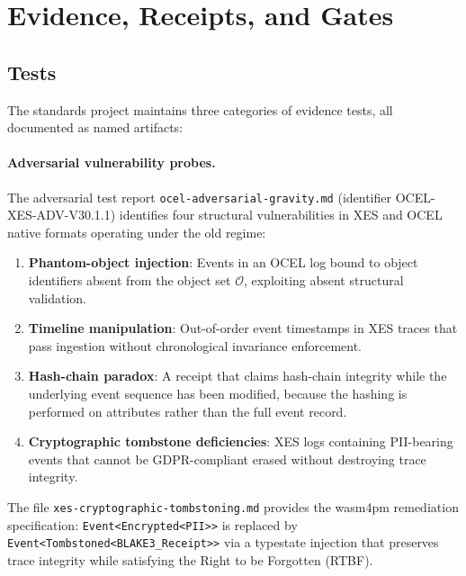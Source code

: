 
\section{Evidence, Receipts, and Gates}
\label{sec:standards-evidence}

\subsection{Tests}
\label{sec:standards-evidence-tests}

The standards project maintains three categories of evidence tests, all documented as
named artifacts:

\paragraph{Adversarial vulnerability probes.}
The adversarial test report \texttt{ocel-adversarial-gravity.md} (identifier
OCEL-XES-ADV-V30.1.1) identifies four structural vulnerabilities in XES and OCEL native
formats operating under the old regime:
\begin{enumerate}
  \item \textbf{Phantom-object injection}: Events in an OCEL log bound to object
        identifiers absent from the object set $\mathcal{O}$, exploiting absent structural
        validation.
  \item \textbf{Timeline manipulation}: Out-of-order event timestamps in XES traces
        that pass ingestion without chronological invariance enforcement.
  \item \textbf{Hash-chain paradox}: A receipt that claims hash-chain integrity while the
        underlying event sequence has been modified, because the hashing is performed on
        attributes rather than the full event record.
  \item \textbf{Cryptographic tombstone deficiencies}: XES logs containing PII-bearing
        events that cannot be GDPR-compliant erased without destroying trace integrity.
\end{enumerate}

The file \texttt{xes-cryptographic-tombstoning.md} provides the wasm4pm remediation
specification: \texttt{Event<Encrypted<PII>>} is replaced by
\texttt{Event<Tombstoned<BLAKE3\_Receipt>>} via a typestate injection that preserves
trace integrity while satisfying the Right to be Forgotten (RTBF).

